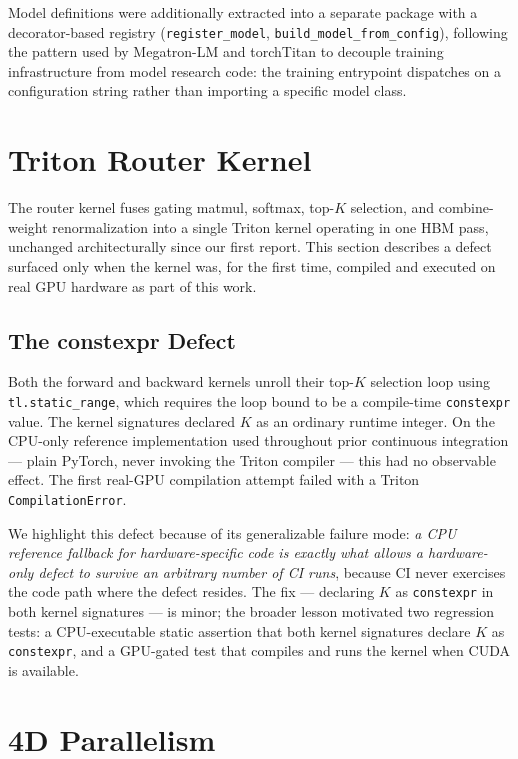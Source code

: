 \documentclass[conference]{IEEEtran}
\begin{document}
Model definitions were additionally extracted into a separate package with
a decorator-based registry (\texttt{register\_model},
\texttt{build\_model\_from\_config}), following the pattern used by
Megatron-LM and torchTitan to decouple training infrastructure from model
research code: the training entrypoint dispatches on a configuration
string rather than importing a specific model class.

\section{Triton Router Kernel}
\label{sec:kernel}

The router kernel fuses gating matmul, softmax, top-$K$ selection, and
combine-weight renormalization into a single Triton kernel operating in
one HBM pass, unchanged architecturally since our first report. This
section describes a defect surfaced only when the kernel was, for the
first time, compiled and executed on real GPU hardware as part of this
work.

\subsection{The constexpr Defect}

Both the forward and backward kernels unroll their top-$K$ selection loop
using \texttt{tl.static\_range}, which requires the loop bound to be a
compile-time \texttt{constexpr} value. The kernel signatures declared $K$
as an ordinary runtime integer. On the CPU-only reference implementation
used throughout prior continuous integration --- plain PyTorch, never
invoking the Triton compiler --- this had no observable effect. The first
real-GPU compilation attempt failed with a Triton
\texttt{CompilationError}.

We highlight this defect because of its generalizable failure mode:
\emph{a CPU reference fallback for hardware-specific code is exactly what
allows a hardware-only defect to survive an arbitrary number of CI runs},
because CI never exercises the code path where the defect resides. The
fix --- declaring $K$ as \texttt{constexpr} in both kernel signatures ---
is minor; the broader lesson motivated two regression tests: a
CPU-executable static assertion that both kernel signatures declare $K$ as
\texttt{constexpr}, and a GPU-gated test that compiles and runs the kernel
when CUDA is available.

\section{4D Parallelism}
\end{document}
